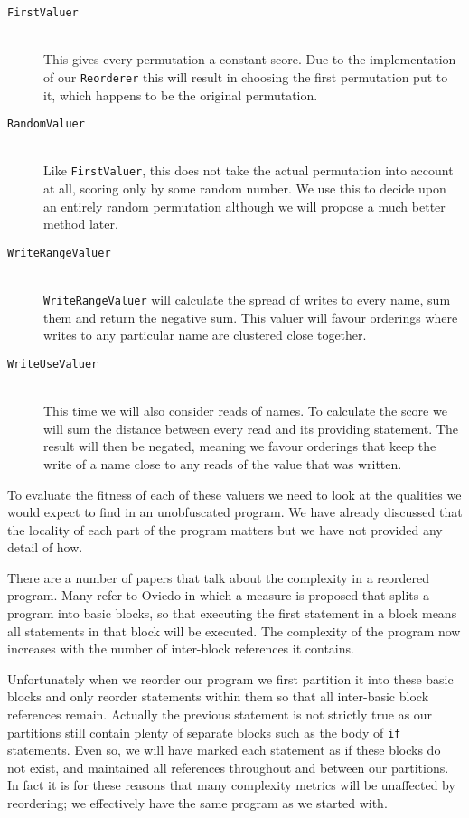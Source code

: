 \documentclass[twoside,a4paper]{report}
\begin{document}
\begin{description}
\item[\texttt{FirstValuer}] \hfill \\
This gives every permutation a constant score. Due to the implementation of our \texttt{Reorderer} this will result in choosing the first permutation put to
it, which happens to be the original permutation.
\item[\texttt{RandomValuer}] \hfill \\
Like \texttt{FirstValuer}, this does not take the actual permutation into account at all, scoring only by some random number. We use this to decide upon an
entirely random permutation although we will propose a much better method later.
\item[\texttt{WriteRangeValuer}] \hfill \\
\texttt{WriteRangeValuer} will calculate the spread of writes to every name, sum them and return the negative sum. This valuer will favour orderings where
writes to any particular name are clustered close together.
\item[\texttt{WriteUseValuer}] \hfill \\
This time we will also consider reads of names. To calculate the score we will sum the distance between every read and its providing statement. The result
will then be negated, meaning we favour orderings that keep the write of a name close to any reads of the value that was written.
\end{description}

To evaluate the fitness of each of these valuers we need to look at the qualities we would expect to find in an unobfuscated program. We have already
discussed that the locality of each part of the program matters but we have not provided any detail of how.

There are a number of papers that talk about the complexity in a reordered program. Many refer to Oviedo \cite{oviedo} in which a measure is proposed
that splits a program into basic blocks, so that executing the first statement in a block means all statements in that block will be executed. The
complexity of the program now increases with the number of inter-block references it contains.

Unfortunately when we reorder our program we first partition it into these basic blocks and only reorder statements within them so that all inter-basic
block references remain. Actually the previous statement is not strictly true as our partitions still contain plenty of separate blocks such as the body
of \texttt{if} statements. Even so, we will have marked each statement as if these blocks do not exist, and maintained all references throughout and
between our partitions. In fact it is for these reasons that many complexity metrics will be unaffected by reordering; we effectively have the same
program as we started with.
\end{document}
